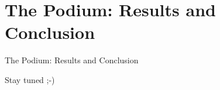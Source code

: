 \documentclass[compress,aspectratio=169]{beamer}
\begin{document}
\section[Results]{The Podium: Results and Conclusion}

\begin{frame}{The Podium: Results and Conclusion}
  \begin{center}
    \LARGE Stay tuned ;-)
  \end{center}
\label{pg:lastpage} %
\end{frame}

\end{document}
